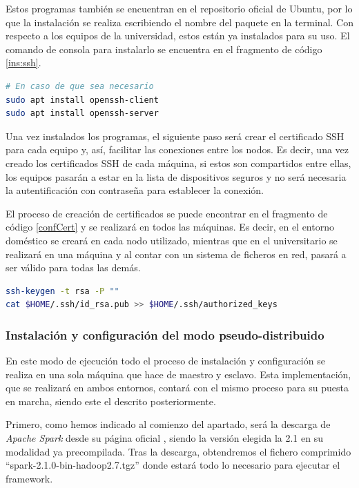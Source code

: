 Estos programas también se encuentran en el repositorio oficial de Ubuntu, por lo que la instalación se realiza escribiendo el nombre del paquete en la terminal. Con respecto a los equipos de la universidad, estos están ya instalados para su uso. El comando de consola para instalarlo se encuentra en el fragmento de código \ref{ins:ssh}.

\begin{lstlisting}[label=ins:ssh,language=sh,frame=single,caption=Instalación del cliente y el servidor de \gls{SSH}]
# En caso de que sea necesario
sudo apt install openssh-client
sudo apt install openssh-server
\end{lstlisting}

Una vez instalados los programas, el siguiente paso será crear el certificado \gls{SSH} para cada equipo y, así, facilitar las conexiones entre los nodos. Es decir, una vez creado los certificados \gls{SSH} de cada máquina, si estos son compartidos entre ellas, los equipos pasarán a estar en la lista de dispositivos seguros y no será necesaria la autentificación con contraseña para establecer la conexión.

El proceso de creación de certificados se puede encontrar en el fragmento de código \ref{confCert} y se realizará en todos las máquinas. Es decir, en el entorno doméstico se creará en cada nodo utilizado, mientras que en el universitario se realizará en una máquina y al contar con un sistema de ficheros en red, pasará a ser válido para todas las demás.

\begin{lstlisting}[label=confCert,language=sh,frame=single,caption=Instalación del cliente y el servidor de \gls{SSH}]
ssh-keygen -t rsa -P ""
cat $HOME/.ssh/id_rsa.pub >> $HOME/.ssh/authorized_keys
\end{lstlisting}

\clearpage
\subsubsection{Instalación y configuración del modo pseudo-distribuido \label{insSparkStand}}
En este modo de ejecución todo el proceso de instalación y configuración se realiza en una sola máquina que hace de maestro y esclavo. Esta implementación, que se realizará en ambos entornos, contará con el mismo proceso para su puesta en marcha, siendo este el descrito posteriormente.

Primero, como hemos indicado al comienzo del apartado, será la descarga de \textit{Apache Spark} desde su página oficial \cite{descargaSpark}, siendo la versión elegida la 2.1 en su modalidad ya precompilada. Tras la descarga, obtendremos el fichero comprimido ``spark-2.1.0-bin-hadoop2.7.tgz'' donde estará todo lo necesario para ejecutar el \gls{framework}.

